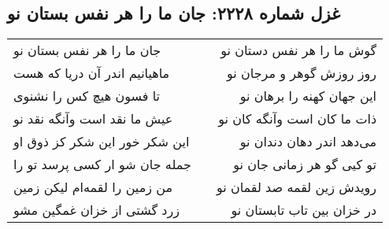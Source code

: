 \begin{center}
\section*{غزل شماره ۲۲۲۸: جان ما را هر نفس بستان نو}
\label{sec:2228}
\begin{longtable}{l p{0.5cm} r}
جان ما را هر نفس بستان نو
&&
گوش ما را هر نفس دستان نو
\\
ماهیانیم اندر آن دریا که هست
&&
روز روزش گوهر و مرجان نو
\\
تا فسون هیچ کس را نشنوی
&&
این جهان کهنه را برهان نو
\\
عیش ما نقد است وآنگه نقد نو
&&
ذات ما کان است وآنگه کان نو
\\
این شکر خور این شکر کز ذوق او
&&
می‌دهد اندر دهان دندان نو
\\
جمله جان شو ار کسی پرسد تو را
&&
تو کیی گو هر زمانی جان نو
\\
من زمین را لقمه‌ام لیکن زمین
&&
رویدش زین لقمه صد لقمان نو
\\
زرد گشتی از خزان غمگین مشو
&&
در خزان بین تاب تابستان نو
\\
\end{longtable}
\end{center}
